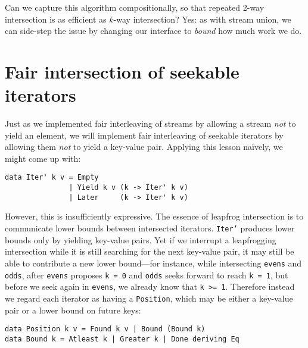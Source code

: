 \documentclass[acmsmall,screen,dvipsnames,svgnames]{acmart}
\newcommand\hask[1]{\texttt{#1}}
\newcommand\ttt\texttt
\begin{document}
Can we capture this algorithm compositionally, so that repeated 2-way intersection is as efficient as $k$-way intersection? Yes: as with stream union, we can side-step the issue by changing our interface to \emph{bound} how much work we do.



\section{Fair intersection of seekable iterators}
\label{sec:fair-intersection}

Just as we implemented fair interleaving of streams by allowing a stream \emph{not} to yield an element, we will implement fair interleaving of seekable iterators by allowing them \emph{not} to yield a key-value pair.
Applying this lesson na\"ively, we might come up with:

\begin{verbatim}
data Iter' k v = Empty
               | Yield k v (k -> Iter' k v)
               | Later     (k -> Iter' k v)
\end{verbatim}

\noindent
However, this is insufficiently expressive.
The essence of leapfrog intersection is to communicate lower bounds between intersected iterators.
\hask{Iter'} produces lower bounds only by yielding key-value pairs.
Yet if we interrupt a leapfrogging intersection while it is still searching for the next key-value pair, it may still be able to contribute a new lower bound---for instance, while intersecting \ttt{evens} and \ttt{odds}, after \ttt{evens} proposes \ttt{k = 0} and \ttt{odds} seeks forward to reach \ttt{k = 1}, but before we seek again in \ttt{evens}, we already know that \ttt{k >= 1}.
%
Therefore instead we regard each iterator as having a \hask{Position}, which may be either a key-value pair or a lower bound on future keys:

\begin{verbatim}
data Position k v = Found k v | Bound (Bound k)
data Bound k = Atleast k | Greater k | Done deriving Eq
\end{verbatim}
\end{document}
